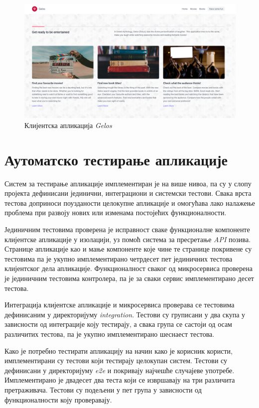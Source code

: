 \documentclass[12pt,oneside]{memoir}
\begin{document}
\begin{figure}[!ht]
  \centering
  \includegraphics[width=\textwidth]{matfmaster/img/client.png}
  \caption{Клијентска апликација \textit{Gelos}}
  \label{fig:client}
\end{figure}
\newpage
\section{Аутоматско тестирање апликације}

Систем за тестирање апликације имплементиран је на више нивоа, па су у слопу пројекта дефинисани јединични, интеграциони и системски тестови. Свака врста тестова доприноси поузданости целокупне апликације и омогућава лако налажење проблема при развоју нових или изменама постојећих функционалности.

Јединичним тестовима проверена је исправност сваке функционалне компоненте клијентске апликације у изолацији, уз помоћ система за пресретање \textit{API} позива. Странице апликације као и мање компоненте које чине те странице покривене су тестовима па је укупно имплементирано четрдесет пет јединичних тестова клијентског дела апликације. Функционалност сваког од микросервиса проверена је јединичним тестовима контролера, па је за сваки сервис имплементирано десет тестова.

Интеграција клијентске апликације и микросервиса проверава се тестовима дефинисаним у директоријуму \textit{integration}. Тестови су груписани у два скупа у зависности од интеграције коју тестирају, а свака група се састоји од осам различитих тестова, па је укупно имплементирано шеснаест тестова.

Како је потребно тестирати апликацију на начин како је корисник користи, имплементирани су тестови који тестирају целокупан систем. Тестови су дефинисани у директоријуму \textit{e2e} и покривају најчешће случајеве употребе. Имплементирано је двадесет два теста који се извршавају на три различита претраживача.  Тестови су подељени у пет група у зависности од функционалности коју проверавају.
\end{document}

